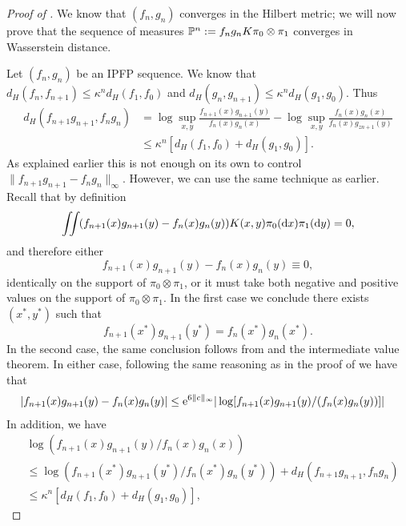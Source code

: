 \documentclass[11pt,a4paper]{article}
\providecommand{\DIFaddtex}[1]{{\protect\color{blue}\uwave{#1}}} %
\providecommand{\DIFdeltex}[1]{{\protect\color{red}\sout{#1}}}                      %
\providecommand{\DIFaddbegin}{} %
\providecommand{\DIFaddend}{} %
\providecommand{\DIFdelbegin}{} %
\providecommand{\DIFdelend}{} %
\providecommand{\DIFadd}[1]{\texorpdfstring{\DIFaddtex{#1}}{#1}} %
\providecommand{\DIFdel}[1]{\texorpdfstring{\DIFdeltex{#1}}{}} %
\begin{document}
\begin{proof}[Proof of ]
We know that $(f_n,g_n)$ converges in the Hilbert metric; we will now prove that the sequence of measures \DIFdelbegin \DIFdel{$\mathbb{P}^n:=f_n g_n K \pi_0 \otimes \pi_1$ }\DIFdelend \DIFaddbegin \DIFadd{$\Pbb^n:=f_n g_n K \pi_0 \otimes \Pi_1$ }\DIFaddend converges in Wasserstein distance. 

Let $(f_n, g_n)$ be an IPFP sequence. We know that $d_H(f_n, f_{n+1})\leq \kappa^n d_H(f_1,f_0)$ and $d_H(g_n, g_{n+1})\leq \kappa^n d_H(g_1,g_0)$.
Thus 
\begin{align}d_H(f_{n+1}g_{n+1}, f_n g_n) 
&= \log \sup_{x,y}\frac{f_{n+1}(x)g_{n+1}(y)}{f_n(x)g_n(x)} - \log \sup_{x,y}\frac{f_n(x)g_n(x)}{f_{n}(x)g_{zn+1}(y)}\\
&\leq \kappa^n \left[ d_H(f_1, f_0)+ d_H(g_1, g_0)\right].
\end{align}
As explained earlier this is not enough on its own to control 
$\|f_{n+1}g_{n+1}-f_n g_n\|_\infty$. 
However, we can use the same technique as earlier. Recall that by definition 
$$\iint (f_{n+1}(x)g_{n+1}(y)-f_n(x) g_n(y)) K(x,y) \DIFdelbegin %
\DIFdelend \pi_0(\DIFaddbegin \rmd \DIFaddend x) \DIFdelbegin %
\DIFdelend \pi_1(\DIFaddbegin \rmd \DIFaddend y) =0, $$
and therefore either 
$$f_{n+1}(x)g_{n+1}(y)-f_n(x) g_n(y)\equiv 0,$$
identically on the support of $\pi_0\otimes \pi_1$, or it must take both negative and positive values on the support of $\pi_0\otimes \pi_1$. In the first case we conclude there exists $(x^\ast, y^\ast)$ such that 
$$f_{n+1}(x^\ast)g_{n+1}(y^\ast) = f_n(x^\ast) g_n(x^\ast).$$
In the second case, the same conclusion follows from  and the intermediate value theorem.
In either case, following the same reasoning as in the proof of  we have that
\begin{align}
| f_{n+1}(x)g_{n+1}(y) - f_n(x) g_n(y)|
&\leq \mathrm{e}^{6\|c\|_\infty} 
\vert \log[f_{n+1}(x)g_{n+1}(y)/({f}_n(x){g}_n(y))] \vert
\end{align}
In addition, we have 
\begin{align}
& \log\left(f_{n+1}(x)g_{n+1}(y)/ f_n(x) g_n(x)\right)\\ 
&\leq \log\left(f_{n+1}(x^\ast)g_{n+1}(y^\ast)/f_{n}(x^\ast)g_{n}(y^\ast)
\right) + d_H(f_{n+1}g_{n+1}, f_n g_n)\\
&\leq \kappa^n \left[ d_H(f_1, f_0)+ d_H(g_1, g_0)\right],

\end{align}
\end{proof}
\end{document}
